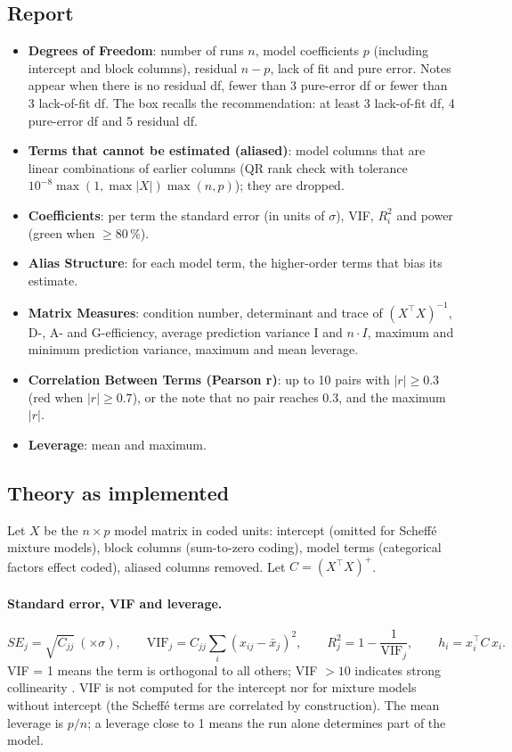 \subsection{Report}
\begin{itemize}
\item \textbf{Degrees of Freedom}: number of runs $n$, model coefficients $p$ (including intercept and block
columns), residual $n - p$, lack of fit and pure error. Notes appear when there is no residual df, fewer than 3
pure-error df or fewer than 3 lack-of-fit df. The box recalls the recommendation: at least 3 lack-of-fit df, 4
pure-error df and 5 residual df.
\item \textbf{Terms that cannot be estimated (aliased)}: model columns that are linear combinations of earlier
columns (QR rank check with tolerance $10^{-8}\max(1, \max|X|)\max(n, p)$); they are dropped.
\item \textbf{Coefficients}: per term the standard error (in units of $\sigma$), VIF, $R_i^2$ and power (green when
$\ge 80\,\%$).
\item \textbf{Alias Structure}: for each model term, the higher-order terms that bias its estimate.
\item \textbf{Matrix Measures}: condition number, determinant and trace of $(X^\top X)^{-1}$, D-, A- and
G-efficiency, average prediction variance I and $n \cdot I$, maximum and minimum prediction variance, maximum and
mean leverage.
\item \textbf{Correlation Between Terms (Pearson r)}: up to 10 pairs with $|r| \ge 0.3$ (red when $|r| \ge 0.7$), or
the note that no pair reaches 0.3, and the maximum $|r|$.
\item \textbf{Leverage}: mean and maximum.
\end{itemize}

\subsection{Theory as implemented}
Let $X$ be the $n \times p$ model matrix in coded units: intercept (omitted for Scheff\'e mixture models), block
columns (sum-to-zero coding), model terms (categorical factors effect coded), aliased columns removed. Let
$C = (X^\top X)^{+}$.

\paragraph{Standard error, VIF and leverage.}
\begin{equation}
SE_j = \sqrt{C_{jj}} \ (\times\sigma), \qquad
\text{VIF}_j = C_{jj} \sum_{i} (x_{ij} - \bar x_j)^2, \qquad R_j^2 = 1 - \frac{1}{\text{VIF}_j}, \qquad
h_i = x_i^\top C\, x_i .
\label{eq:ch04-se}
\end{equation}
VIF = 1 means the term is orthogonal to all others; VIF $> 10$ indicates strong collinearity \citep{belsley1980}.
VIF is not computed for the intercept nor for mixture models without intercept (the Scheff\'e terms are correlated
by construction). The mean leverage is $p/n$; a leverage close to 1 means the run alone determines part of the
model.


